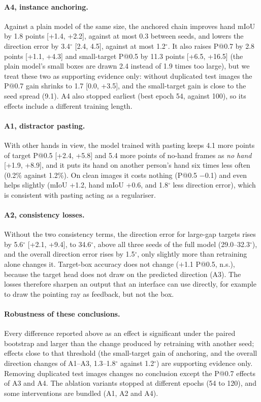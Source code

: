 \paragraph{A4, instance anchoring.} Against a plain model of the same size, the anchored chain improves hand mIoU by 1.8 points [+1.4, +2.2], against at most 0.3 between seeds, and lowers the direction error by 3.4$^\circ$ [2.4, 4.5], against at most 1.2$^\circ$. It also raises P@0.7 by 2.8 points [+1.1, +4.3] and small-target P@0.5 by 11.3 points [+6.5, +16.5] (the plain model's small boxes are drawn 2.4 instead of 1.9 times too large), but we treat these two as supporting evidence only: without duplicated test images the P@0.7 gain shrinks to 1.7 [0.0, +3.5], and the small-target gain is close to the seed spread (9.1). A4 also stopped earliest (best epoch 54, against 100), so its effects include a different training length.

\paragraph{A1, distractor pasting.} With other hands in view, the model trained with pasting keeps 4.1 more points of target P@0.5 [+2.4, +5.8] and 5.4 more points of no-hand frames as \emph{no hand} [+1.9, +8.9], and it puts its hand on another person's hand six times less often (0.2\% against 1.2\%). On clean images it costs nothing (P@0.5 $-$0.1) and even helps slightly (mIoU +1.2, hand mIoU +0.6, and 1.8$^\circ$ less direction error), which is consistent with pasting acting as a regulariser.

\paragraph{A2, consistency losses.} Without the two consistency terms, the direction error for large-gap targets rises by 5.6$^\circ$ [+2.1, +9.4], to 34.6$^\circ$, above all three seeds of the full model (29.0--32.3$^\circ$), and the overall direction error rises by 1.5$^\circ$, only slightly more than retraining alone changes it. Target-box accuracy does not change ($+$1.1 P@0.5, n.s.), because the target head does not draw on the predicted direction (A3). The losses therefore sharpen an output that an interface can use directly, for example to draw the pointing ray as feedback, but not the box.

\paragraph{Robustness of these conclusions.} Every difference reported above as an effect is significant under the paired bootstrap and larger than the change produced by retraining with another seed; effects close to that threshold (the small-target gain of anchoring, and the overall direction changes of A1--A3, 1.3--1.8$^\circ$ against 1.2$^\circ$) are supporting evidence only. Removing duplicated test images changes no conclusion except the P@0.7 effects of A3 and A4. The ablation variants stopped at different epochs (54 to 120), and some interventions are bundled (A1, A2 and A4).

